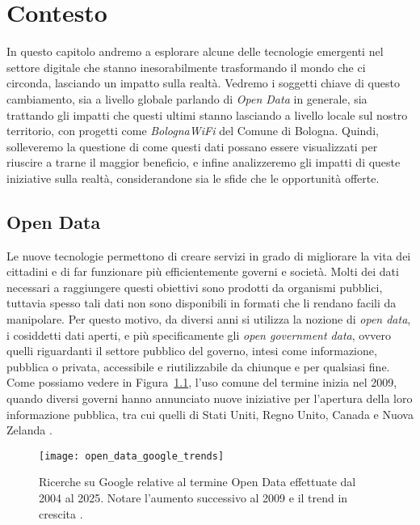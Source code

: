 \clearpage{\pagestyle{empty}\cleardoublepage}
\chapter{Contesto}
\lhead[\fancyplain{}{\bfseries\thepage}]{\fancyplain{}{\bfseries\rightmark}}

In questo capitolo andremo a esplorare alcune delle tecnologie emergenti nel settore digitale che stanno inesorabilmente trasformando il mondo che ci circonda, lasciando un impatto sulla realtà. Vedremo i soggetti chiave di questo cambiamento, sia a livello globale parlando di \textit{Open Data} in generale, sia trattando gli impatti che questi ultimi stanno lasciando a livello locale sul nostro territorio, con progetti come \textit{BolognaWiFi} del Comune di Bologna. Quindi, solleveremo la questione di come questi dati possano essere visualizzati per riuscire a trarne il maggior beneficio, e infine analizzeremo gli impatti di queste iniziative sulla realtà, considerandone sia le sfide che le opportunità offerte.

\section{Open Data} %
Le nuove tecnologie permettono di creare servizi in grado di migliorare la vita dei cittadini e di far funzionare più efficientemente governi e società. Molti dei dati necessari a raggiungere questi obiettivi sono prodotti da organismi pubblici, tuttavia spesso tali dati non sono disponibili in formati che li rendano facili da manipolare. Per questo motivo, da diversi anni si utilizza la nozione di \textit{open data}, i cosiddetti dati aperti, e più specificamente gli \textit{open government data}, ovvero quelli riguardanti il settore pubblico del governo, intesi come informazione, pubblica o privata, accessibile e riutilizzabile da chiunque e per qualsiasi fine. Come possiamo vedere in Figura~\ref{fig:open_data_google_trends}, l'uso comune del termine inizia nel 2009, quando diversi governi hanno annunciato nuove iniziative per l'apertura della loro informazione pubblica, tra cui quelli di Stati Uniti, Regno Unito, Canada e Nuova Zelanda \cite{OpenDataHandbook_Introduction}.

\begin{figure}[H]
    \centering
    \texttt{[image: open\_data\_google\_trends]}
    \caption[Open Data su Google Trends]{Ricerche su Google relative al termine Open Data effettuate dal 2004 al 2025. Notare l'aumento successivo al 2009 e il trend in crescita \cite{Google_Trends}.}
    \label{fig:open_data_google_trends}
\end{figure}

